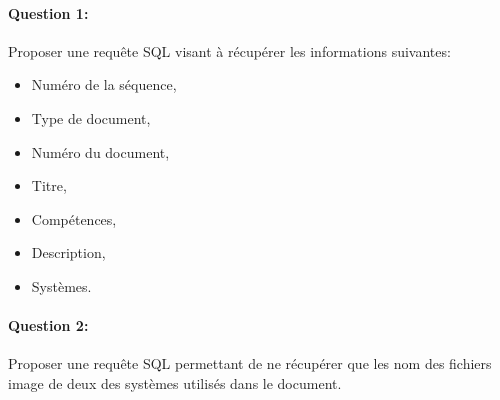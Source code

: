 \newpage

\paragraph{Question 1:} Proposer une requête SQL visant à récupérer les informations suivantes:
\begin{itemize}
 \item Numéro de la séquence,
 \item Type de document,
 \item Numéro du document, 
 \item Titre,
 \item Compétences,
 \item Description,
 \item Systèmes.
\end{itemize}

\paragraph{Question 2:} Proposer une requête SQL permettant de ne récupérer que les nom des fichiers image de deux des systèmes utilisés dans le document.


